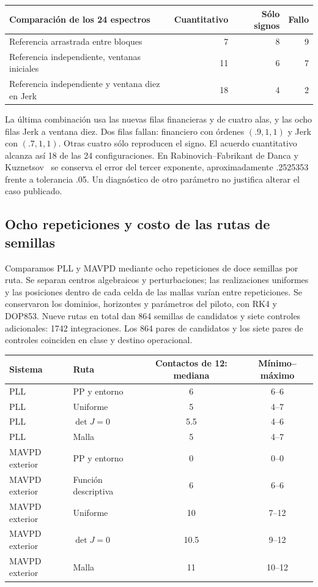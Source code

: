 \begin{center}
\begin{tabular}{lrrr}
\toprule
Comparación de los 24 espectros & Cuantitativo & Sólo signos & Fallo\\\midrule
Referencia arrastrada entre bloques & 7 & 8 & 9\\
Referencia independiente, ventanas iniciales & 11 & 6 & 7\\
Referencia independiente y ventana diez en Jerk & 18 & 4 & 2\\\bottomrule
\end{tabular}
\end{center}

La última combinación usa las nuevas filas financieras y de cuatro alas,
y las ocho filas Jerk a ventana diez. Dos filas fallan: financiero con
órdenes $(.9,1,1)$ y Jerk con $(.7,1,1)$. Otras cuatro sólo reproducen el
signo. El acuerdo cuantitativo alcanza así 18 de las 24 configuraciones. En Rabinovich--Fabrikant
de Danca y Kuznetsov~\cite{DancaKuznetsov2018Lyapunov} se conserva el error
del tercer exponente, aproximadamente .2525353 frente a tolerancia .05.
Un diagnóstico de otro parámetro no justifica alterar el caso publicado.

\subsection{Ocho repeticiones y costo de las rutas de semillas}

Comparamos PLL y MAVPD mediante ocho repeticiones de doce semillas por
ruta. Se separan centros algebraicos y perturbaciones; las
realizaciones uniformes y las posiciones dentro de cada celda de las mallas
varían entre repeticiones. Se conservaron los dominios, horizontes y
parámetros del piloto, con RK4 y DOP853. Nueve rutas en total dan 864
semillas de candidatos y siete controles adicionales: 1742 integraciones.
Los 864 pares de candidatos y los siete pares de controles coinciden en
clase y destino operacional.

\begin{center}
\begin{tabular}{llcc}
\toprule
Sistema & Ruta & Contactos de 12: mediana & Mínimo--máximo\\\midrule
PLL & PP y entorno & 6 & 6--6\\
PLL & Uniforme & 5 & 4--7\\
PLL & $\det J=0$ & 5.5 & 4--6\\
PLL & Malla & 5 & 4--7\\
MAVPD exterior & PP y entorno & 0 & 0--0\\
MAVPD exterior & Función descriptiva & 6 & 6--6\\
MAVPD exterior & Uniforme & 10 & 7--12\\
MAVPD exterior & $\det J=0$ & 10.5 & 9--12\\
MAVPD exterior & Malla & 11 & 10--12\\\bottomrule
\end{tabular}
\end{center}

